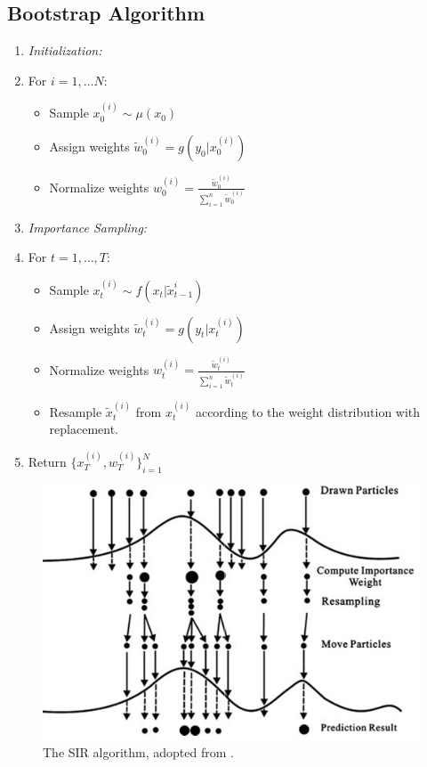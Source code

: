 \documentclass{article}
\begin{document}
\subsection{Bootstrap Algorithm}
\begin{enumerate}
\item \textit{Initialization:}
\item[] For $i=1,\dots N$:
\begin{itemize}
\item[] Sample $x_0^{(i)} \sim \mu(x_0)$
\item[] Assign weights $\widetilde{w}_0^{(i)} = g(y_0|x_0^{(i)})$
\item[] Normalize weights $w_0^{(i)} = \frac{\widetilde{w}_0^{(i)}}{\sum_{i=1}^{n} \widetilde{w}_0^{(i)}}$
\end{itemize}
\item \textit{Importance Sampling:}
\item[] For $t=1,\dots,T$:
\begin{itemize}
\item[] Sample $x_t^{(i)} \sim f(x_t|\widetilde{x}_{t-1}^{i})$
\item[] Assign weights $\widetilde{w}_t^{(i)} = g(y_t|x_t^{(i)})$
\item[] Normalize weights $w_t^{(i)} = \frac{\widetilde{w}_t^{(i)}}{\sum_{i=1}^{n} \widetilde{w}_t^{(i)}}$
\item[] Resample $\widetilde{x}_t^{(i)}$ from $x_t^{(i)}$ according to the weight distribution with replacement.
\end{itemize}
\item Return $\{x_T^{(i)},w_T^{(i)}\}_{i=1}^N$
\end{enumerate}

\begin{figure}
\centering
\includegraphics[scale=.25]{sir}
\caption{The SIR algorithm, adopted from \cite{sirfig}.}
\label{fig:sir}
\end{figure}
\end{document}
